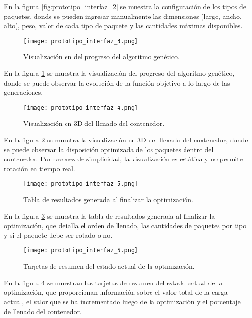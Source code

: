 \documentclass[9pt,a4paper]{rho}
\begin{document}
En la figura \ref{fig:prototipo_interfaz_2} se muestra la configuración de los tipos de paquetes, donde se pueden ingresar manualmente las dimensiones (largo, ancho, alto), peso, valor de cada tipo de paquete y las cantidades máximas disponibles.

\begin{figure}[h!]
    \centering
    \texttt{[image: prototipo\_interfaz\_3.png]}
    \caption{Visualización en del progreso del algoritmo genético.}
    \label{fig:prototipo_interfaz_3}
\end{figure}

En la figura \ref{fig:prototipo_interfaz_3} se muestra la visualización del progreso del algoritmo genético, donde se puede observar la evolución de la función objetivo a lo largo de las generaciones.

\begin{figure}[h!]
    \centering
    \texttt{[image: prototipo\_interfaz\_4.png]}
    \caption{Visualización en 3D del llenado del contenedor.}
    \label{fig:prototipo_interfaz_4}
\end{figure}

En la figura \ref{fig:prototipo_interfaz_4} se muestra la visualización en 3D del llenado del contenedor, donde se puede observar la disposición optimizada de los paquetes dentro del contenedor. Por razones de simplicidad, la visualización es estática y no permite rotación en tiempo real.

\begin{figure}[h!]
    \centering
    \texttt{[image: prototipo\_interfaz\_5.png]}
    \caption{Tabla de resultados generada al finalizar la optimización.}
    \label{fig:prototipo_interfaz_5}
\end{figure}

En la figura \ref{fig:prototipo_interfaz_5} se muestra la tabla de resultados generada al finalizar la optimización, que detalla el orden de llenado, las cantidades de paquetes por tipo y si el paquete debe ser rotado o no.

\begin{figure}[h!]
    \centering
    \texttt{[image: prototipo\_interfaz\_6.png]}
    \caption{Tarjetas de resumen del estado actual de la optimización.}
    \label{fig:prototipo_interfaz_6}
\end{figure}

En la figura \ref{fig:prototipo_interfaz_6} se muestran las tarjetas de resumen del estado actual de la optimización, que proporcionan información sobre el valor total de la carga actual, el valor que se ha incrementado luego de la optimización y el porcentaje de llenado del contenedor.
\end{document}
